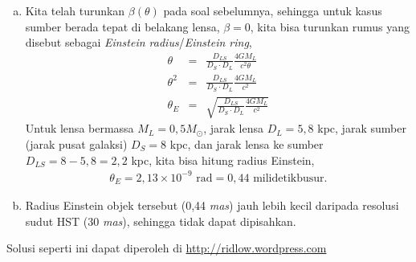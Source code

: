 \documentclass[11pt,fleqn]{exam}
\begin{document}
\begin{questions}
\begin{enumerate}[a.]
    \item Kita telah turunkan $\beta(\theta)$ pada soal sebelumnya, sehingga untuk kasus sumber berada tepat di belakang lensa, $\beta = 0$, kita bisa turunkan rumus yang disebut sebagai \textit{Einstein radius}/\textit{Einstein ring},
    \begin{eqnarray*}
        \theta &=& \frac{D_{LS}}{D_S \cdot D_L} \frac{4GM_L}{c^2 \theta}\\
        \theta^2 &=& \frac{D_{LS}}{D_S \cdot D_L} \frac{4GM_L}{c^2}\\
        \theta_{E} &=& \sqrt{\frac{D_{LS}}{D_S \cdot D_L} \frac{4GM_L}{c^2}}
    \end{eqnarray*}
    Untuk lensa bermassa $M_L = 0,5 M_\odot$, jarak lensa $D_{L} = 5,8$ kpc, jarak sumber (jarak pusat galaksi) $D_S = 8$ kpc, dan jarak lensa ke sumber $D_{LS} = 8 - 5,8 = 2,2$ kpc, kita bisa hitung radius Einstein,
    \begin{eqnarray*}
        \theta_E = 2,13 \times 10^{-9} \text{ rad} = 0,44 \text{ milidetikbusur}.
    \end{eqnarray*}

    \item Radius Einstein objek tersebut (0,44 \textit{mas}) jauh lebih kecil daripada resolusi sudut HST (30 \textit{mas}), sehingga tidak dapat dipisahkan.
\end{enumerate}

\end{questions}

\vspace{3cm}
\begin{flushright}
Solusi seperti ini dapat diperoleh di \url{http://ridlow.wordpress.com}
\end{flushright}
\end{document}
